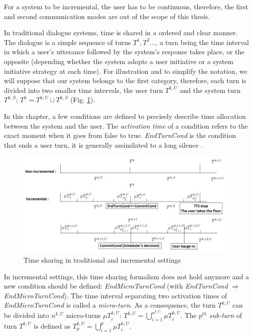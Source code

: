         For a system to be incremental, the user has to be continuous, therefore, the first and second communication modes are out of the scope of this thesis.
    
    
    	In traditional dialogue systems, time is shared in a ordered and clear manner. The dialogue is a simple sequence of turns $T^1,T^2...$, a turn being the time interval in which a user's utterance followed by the system's response takes place, or the opposite (depending whether the system adopts a user initiative or a system initiative strategy at each time). For illustration and to simplify the notation, we will suppose that our system belongs to the first category, therefore, each turn is divided into two smaller time intervals, the user turn $T^{k,U}$ and the system turn $T^{k,S}$: $T^k = T^{k,U} \cup T^{k,S}$ (Fig. \ref{fig:timeshare}).
        
        In this chapter, a few conditions are defined to precisely describe time allocation between the system and the user. The \textit{activation time} of a condition refers to the exact moment when it goes from false to true. \textit{EndTurnCond} is the condition that ends a user turn, it is generally assimilated to a long silence \cite{Raux2008,Wlodarczak2013}.
        
        \begin{figure}[t]
          \centering
          \includegraphics[scale=0.6]{figures/Timeline.jpg}
          \caption{Time sharing in traditional and incremental settings}
          \label{fig:timeshare}
        \end{figure}
        
        In incremental settings, this time sharing formalism does not hold anymore and a new condition should be defined: \textit{EndMicroTurnCond} (with \textit{EndTurnCond} $\Rightarrow$ \textit{EndMicroTurnCond}). The time interval separating two activation times of \textit{EndMicroTurnCond} is called a \textit{micro-turn}. As a consequence, the turn $T^{k,U}$ can be divided into $n^{k,U}$ micro-turns $\mu T^{k,U}_i$: $T^{k,U} = \bigcup_{i=1}^{n^{k,U}} \mu T^{k,U}_i$. The $p^{th}$ \textit{sub-turn} of turn $T^{k,U}$ is defined as $T^{k,U}_p = \bigcup_{i=1}^p \mu T^{k,U}_i$.
        
